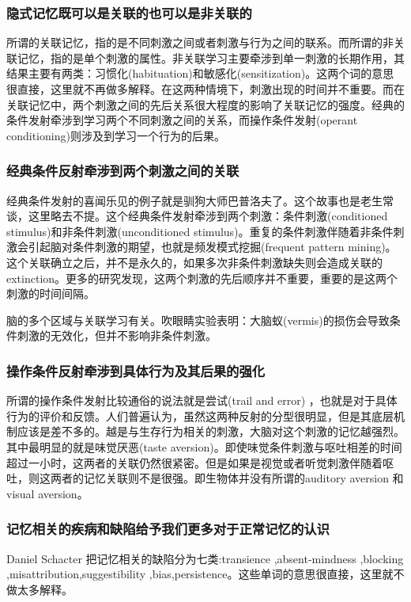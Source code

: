 \documentclass[UTF8,nofonts]{ctexart}
\begin{document}
\subsubsection{隐式记忆既可以是关联的也可以是非关联的}
所谓的关联记忆，指的是不同刺激之间或者刺激与行为之间的联系。而所谓的非关联记忆，指的是单个刺激的属性。非关联学习主要牵涉到单一刺激的长期作用，其结果主要有两类：习惯化(habituation)和敏感化(sensitization)。这两个词的意思很直接，这里就不再做多解释。在这两种情境下，刺激出现的时间并不重要。而在关联记忆中，两个刺激之间的先后关系很大程度的影响了关联记忆的强度。经典的条件发射牵涉到学习两个不同刺激之间的关系，而操作条件发射(operant conditioning)则涉及到学习一个行为的后果。
\subsubsection{经典条件反射牵涉到两个刺激之间的关联}
经典条件发射的喜闻乐见的例子就是驯狗大师巴普洛夫了。这个故事也是老生常谈，这里略去不提。这个经典条件发射牵涉到两个刺激：条件刺激(conditioned stimulus)和非条件刺激(unconditioned stimulus)。重复的条件刺激伴随着非条件刺激会引起脑对条件刺激的期望，也就是频发模式挖掘(frequent pattern mining)。这个关联确立之后，并不是永久的，如果多次非条件刺激缺失则会造成关联的extinction。更多的研究发现，这两个刺激的先后顺序并不重要，重要的是这两个刺激的时间间隔。
\par
脑的多个区域与关联学习有关。吹眼睛实验表明：大脑蚁(vermis)的损伤会导致条件刺激的无效化，但并不影响非条件刺激。
\subsubsection{操作条件反射牵涉到具体行为及其后果的强化}
所谓的操作条件发射比较通俗的说法就是尝试(trail and error) ，也就是对于具体行为的评价和反馈。人们普遍认为，虽然这两种反射的分型很明显，但是其底层机制应该是差不多的。越是与生存行为相关的刺激，大脑对这个刺激的记忆越强烈。其中最明显的就是味觉厌恶(taste aversion)。即使味觉条件刺激与呕吐相差的时间超过一小时，这两者的关联仍然很紧密。但是如果是视觉或者听觉刺激伴随着呕吐，则这两者的记忆关联则不是很强。即生物体并没有所谓的auditory aversion 和visual aversion。
\subsubsection{记忆相关的疾病和缺陷给予我们更多对于正常记忆的认识}
Daniel Schacter 把记忆相关的缺陷分为七类:transience ,absent-mindness ,blocking ,misattribution,suggestibility ,bias,persistence。这些单词的意思很直接，这里就不做太多解释。
\end{document}
